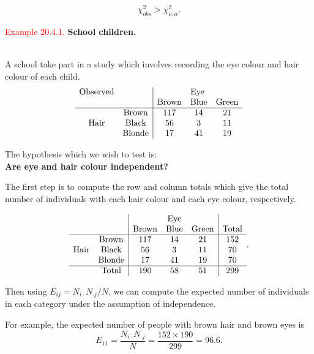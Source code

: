 \documentclass[
]{book}
\begin{document}
\[ \chi^2_{obs} > \chi^2_{\nu, \alpha}.\]

\hypertarget{Hypo_Test_Discrete:ex:school}{}
\textcolor{red}{Example 20.4.1.}
{\textbf{School children.}}\\
\strut \\
A school take part in a study which involves recording the eye
colour and hair colour of each child.\\

\[
\begin{array}{cc|ccc} \mbox{Observed} & & & \mbox{Eye } & \\ & & \mbox{Brown} & \mbox{Blue} & \mbox{Green} \\ \hline &\mbox{Brown} & 117 & 14 & 21 \\ \mbox{Hair} & \mbox{Black} & 56 & 3& 11 \\  & \mbox{Blonde} & 17 & 41 & 19 \end{array} 
\]

The hypothesis which we wish to test
is:\\

{\textbf{Are eye and hair colour independent?}}

\hfill\break

\leavevmode{}%
The first step is to compute the row and column totals which give the total number of individuals with each hair colour and each eye colour, respectively.

\[  \begin{array}{cc|ccc|c} &  &  &  \mbox{Eye} &  \\ &  &  \mbox{Brown} &  \mbox{Blue} &  \mbox{Green} &  \mbox{Total}\\ \hline &  \mbox{Brown} & 117 &  14 &  21&  152 \\ \mbox{Hair} &  \mbox{Black} &  56 &  3&  11&  70 \\ &  \mbox{Blonde} & 17 &  41 &  19 &  70 \\ \hline &  \mbox{Total} &  190 &  58 &  51 &  299 \end{array}. \]

Then using \(E_{ij} = N_{i \cdot} N_{\cdot j}/N\), we can compute the expected number of individuals in each category under the assumption of independence.

For example, the expected number of people with brown hair and brown eyes is\\

\[ E_{11} = \frac{N_{i \cdot} N_{\cdot j}}{N} = \frac{152 \times 190}{299} = 96.6. \]
\end{document}
